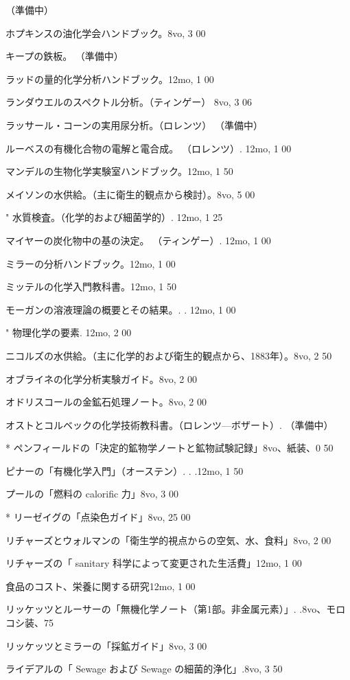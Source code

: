 \documentclass[a4paper,11pt,openany]{ltjsbook}
\begin{document}
（準備中）

ホプキンスの油化学会ハンドブック。8vo, 3 00

キープの鉄板。 （準備中）

ラッドの量的化学分析ハンドブック。12mo, 1 00

ランダウエルのスペクトル分析。（ティンゲー） 8vo, 3 06

ラッサール・コーンの実用尿分析。（ロレンツ） （準備中）

ルーベスの有機化合物の電解と電合成。 （ロレンツ）. 12mo, 1 00

マンデルの生物化学実験室ハンドブック。12mo, 1 50

メイソンの水供給。（主に衛生的観点から検討）。8vo, 5 00

" 水質検査。（化学的および細菌学的）. 12mo, 1 25

マイヤーの炭化物中の基の決定。 （ティンゲー）. 12mo, 1 00

ミラーの分析ハンドブック。12mo, 1 00

ミッテルの化学入門教科書。12mo, 1 50

モーガンの溶液理論の概要とその結果。. . 12mo, 1 00

" 物理化学の要素. 12mo, 2 00

ニコルズの水供給。（主に化学的および衛生的観点から、1883年）。8vo, 2 50

オブライネの化学分析実験ガイド。8vo, 2 00

オドリスコールの金鉱石処理ノート。8vo, 2 00

オストとコルベックの化学技術教科書。（ロレンツ—ボザート）. （準備中）

* ペンフィールドの「決定的鉱物学ノートと鉱物試験記録」8vo、紙装、0 50

ピナーの「有機化学入門」（オーステン）. . .12mo, 1 50

プールの「燃料の calorific 力」8vo, 3 00

* リーゼイグの「点染色ガイド」8vo, 25 00

リチャーズとウォルマンの「衛生学的視点からの空気、水、食料」8vo, 2 00

リチャーズの「 sanitary 科学によって変更された生活費」12mo, 1 00

食品のコスト、栄養に関する研究12mo, 1 00

リッケッツとルーサーの「無機化学ノート（第1部。非金属元素）」. .8vo、モロコシ装、75

リッケッツとミラーの「採鉱ガイド」8vo, 3 00

ライデアルの「 Sewage および Sewage の細菌的浄化」.8vo, 3 50
\end{document}
